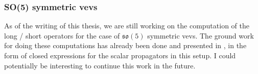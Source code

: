 \subsubsection{SO(5) symmetric vevs}
As of the writing of this thesis, we are still working on the computation of the long / short operators for the case of $\mathfrak{so}(5)$ symmetric vevs. The ground work for doing these computations has already been done and presented in \cite{One-point functions in D3-D7 SO(5)}, in the form of closed expressions for the scalar propagators in this setup. I could potentially be interesting to continue this work in the future. 
%
